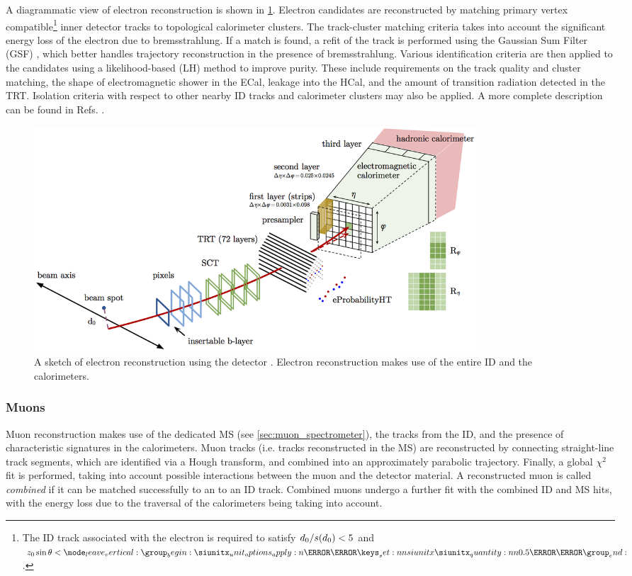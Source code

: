 A diagrammatic view of electron reconstruction is shown in \cref{fig:electron_Reco}.
Electron candidates are reconstructed by matching primary vertex compatible\footnote{The ID track associated with the electron is required to satisfy $d_{0} / s(d_0) < 5$ and $\zzero\sin\theta < \SI{0.5}{\milli\meter}$.} inner detector tracks to topological calorimeter clusters.
The track-cluster matching criteria takes into account the significant energy loss of the electron due to bremsstrahlung.
If a match is found, a refit of the track is performed using the Gaussian Sum Filter (GSF) \cite{ATLAS-CONF-2012-047}, which better handles trajectory reconstruction in the presence of bremsstrahlung.
Various identification criteria are then applied to the candidates using a likelihood-based (LH) method to improve purity.
These include requirements on the track quality and cluster matching, the shape of electromagnetic shower in the ECal, leakage into the HCal, and the amount of transition radiation detected in the TRT.
Isolation criteria with respect to other nearby ID tracks and calorimeter clusters may also be applied.
A more complete description can be found in Refs. \cite{ATL-PHYS-PUB-2017-022,EGAM-2018-01}.
%
\begin{figure}[!htbp]
  \centering
  \includegraphics[width=0.8\textwidth]{chapters/2.detector/figs/electron_reco.png}
  \caption{
    A sketch of electron reconstruction using the \ATLAS detector \cite{ATLAS-CONF-2016-024}.
    Electron reconstruction makes use of the entire ID and the calorimeters.
  }
  \label{fig:electron_Reco}
\end{figure}
%


\subsubsection{Muons}
Muon reconstruction makes use of the dedicated MS (see \cref{sec:muon_spectrometer}), the tracks from the ID, and the presence of characteristic signatures in the calorimeters.
Muon tracks (i.e. tracks reconstructed in the MS) are reconstructed by connecting straight-line track segments, which are identified via a Hough transform, and combined into an approximately parabolic trajectory.
Finally, a global $\chi^2$ fit is performed, taking into account possible interactions between the muon and the detector material.
A reconstructed muon is called \textit{combined} if it can be matched successfully to an to an ID track.
Combined muons undergo a further fit with the combined ID and MS hits, with the energy loss due to the traversal of the calorimeters being taking into account.

